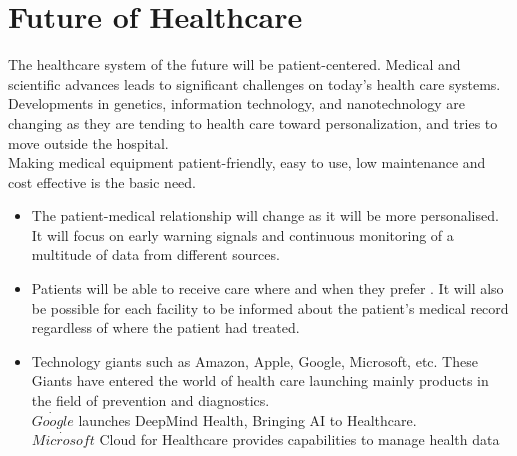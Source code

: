 \documentclass[12pt]{article}
\begin{document}
\centering
\section*{ \Huge Future of Healthcare }
\raggedright \Large The healthcare system of the future will be patient-centered.
\Large Medical and scientific advances leads to significant challenges on today's health care systems. Developments in genetics, information technology, and nanotechnology are changing as they are tending to health care toward personalization, and tries to move outside the hospital. 
\\
\Large Making medical equipment patient-friendly, easy to use, low maintenance and cost effective is the basic need.
\begin{itemize}
\item \Large The patient-medical relationship will change as it will be more personalised. It will focus on early warning signals and continuous monitoring of a multitude of data from different sources.

\item Patients will be able to receive care where and when they prefer . It will also be possible for each facility to be informed about the patient's medical record regardless of where the patient had treated.

\item Technology giants such as Amazon, Apple, Google, Microsoft, etc. These Giants have entered the world of health care launching mainly products in the field of prevention and diagnostics.
\\$ \dot{Google } $ launches DeepMind Health, Bringing AI to Healthcare.
\\$ \dot{Microsoft } $  Cloud for Healthcare provides capabilities to manage health data
\end{itemize}
\end{document}
